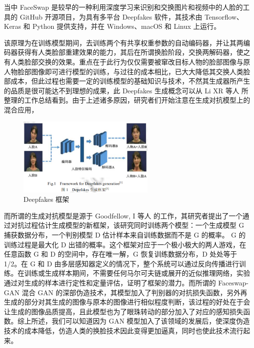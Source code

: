 当中 FaceSwap \cite{list1101} 是较早的一种利用深度学习来识别和交换图片和视频中的人脸的工具的 GitHub 开源项目，为具有多平台 Deepfakes 软件，其技术由 Tensorflow、Keras 和 Python 提供支持，并在 Windows、macOS 和 Linux 上运行。

该原理为在训练模型期间，去训练两个有共享权重参数的自动编码器，并让其两编码器获得有人类脸部重建效果的能力，其后在所谓换脸阶段，交换两解码器，使之有人类脸部交换的效果。重点在于此行为仅仅需要被窜改目标人物的脸部图像与原人物脸部图像即可进行模型的训练，与过往的成本相比，已大大降低其交换人类脸部成本，但此过程也需要一定的训练模型的基础知识与技术，不然其生成器所产生的品质是很可能达不到理想的成果，此 Deepfakes 生成概念可以从 Li XR 等人 \cite{2021496}所整理的工作总结看到。由于上述诸多原因，研究者们开始注意在生成对抗模型上的混合应用，

\begin{figure}[htb]
\centering 
\includegraphics[width=0.60\textwidth]{img/ch1m8.png} 
\caption{Deepfakes 框架}
\label{Test}
\end{figure}

而所谓的生成对抗模型是源于 Goodfellow, I 等人 \cite{goodfellow2014generative}的工作，其研究者提出了一个通过对抗过程估计生成模型的新框架，该研究同时训练两个模型：一个生成模型 G 捕获数据分布，一个判别模型 D 估计样本来自训练数据而不是 G 的概率。 G 的训练过程是最大化 D 出错的概率。这个框架对应于一个极小极大的两人游戏，在任意函数 G 和 D 的空间中，存在唯一解，G 恢复训练数据分布，D 处处等于 1/2。在 G 和 D 由多层感知器定义的情况下，整个系统可以通过反向传播进行训练。在训练或生成样本期间，不需要任何马尔可夫链或展开的近似推理网络，实验通过对生成的样本进行定性和定量评估，证明了框架的潜力。而所谓的  Faceswap-GAN 混合 GAN 的深部伪造技术，其模型加入了判别器的对抗损失函数，另外再生成的部分对其生成的图像与原本的图像进行相似程度判断，该过程的好处在于会让生成的图像品质提高，且此模型也为了眼珠转动的部分加入了对应的感知损失函数。综上所述，我们可以知道因为 GAN 模型加入了该领域的发展后，使深度伪造技术的成本降低，仿造人类的换脸技术因此变得更加逼真，同时也使此技术流行起来。


